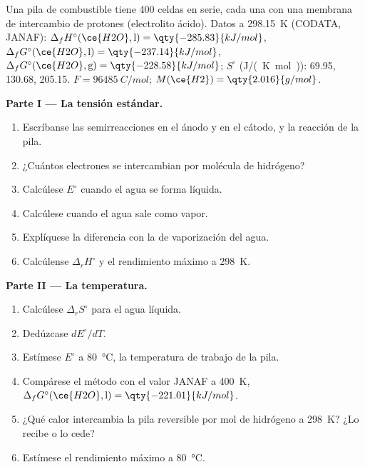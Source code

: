 \begin{problem}
\label{pb:b2:cell-thermodynamics:1}
Una pila de combustible tiene 400 celdas en serie, cada una con una membrana de
intercambio de protones (electrolito ácido). Datos a \qty{298.15}{K} (CODATA, JANAF):
$\Delta_f H^\circ(\ce{H2O}, \text{l}) = \qty{-285.83}{kJ/mol}$, $\Delta_f
G^\circ(\ce{H2O}, \text{l}) = \qty{-237.14}{kJ/mol}$, $\Delta_f G^\circ(\ce{H2O},
\text{g}) = \qty{-228.58}{kJ/mol}$; $S^\circ$ (\unit{J/(K.mol)}):  69.95,
 130.68,  205.15. $F = \qty{96485}{C/mol}$; $M(\ce{H2}) =
\qty{2.016}{g/mol}$.

\medskip
\noindent\textbf{Parte I --- La tensión estándar.}
\begin{enumerate}
  \item Escríbanse las semirreacciones en el ánodo y en el cátodo, y la reacción de
        la pila.
  \item ¿Cuántos electrones se intercambian por molécula de hidrógeno?
  \item Calcúlese $E^\circ$ cuando el agua se forma líquida.
  \item Calcúlese cuando el agua sale como vapor.
  \item Explíquese la diferencia con la  de vaporización del agua.
  \item Calcúlense $\Delta_r H^\circ$ y el rendimiento máximo a \qty{298}{K}.
\end{enumerate}

\medskip
\noindent\textbf{Parte II --- La temperatura.}
\begin{enumerate}[resume]
  \item Calcúlese $\Delta_r S^\circ$ para el agua líquida.
  \item Dedúzcase $dE^\circ/dT$.
  \item Estímese $E^\circ$ a \qty{80}{\degreeCelsius}, la temperatura de trabajo de la
        pila.
  \item Compárese el método con el valor JANAF a \qty{400}{K}, $\Delta_f
        G^\circ(\ce{H2O}, \text{l}) = \qty{-221.01}{kJ/mol}$.
  \item ¿Qué calor intercambia la pila reversible por mol de hidrógeno a
        \qty{298}{K}? ¿Lo recibe o lo cede?
  \item Estímese el rendimiento máximo a \qty{80}{\degreeCelsius}.
\end{enumerate}


\end{problem}
